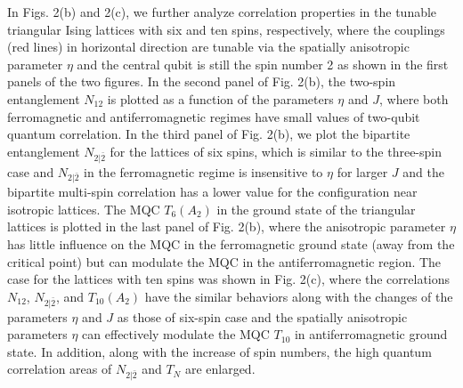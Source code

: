 \documentclass[pra,aps,twocolumn,showpacs]{revtex4}
\begin{document}
In Figs. 2(b) and 2(c), we further analyze correlation properties in the tunable triangular Ising lattices with six and ten spins, respectively, where the couplings (red lines) in horizontal direction are tunable via the spatially anisotropic parameter $\eta$ and the central qubit is still the spin number 2 as shown in the first panels of the two figures. In the second panel of Fig. 2(b), the two-spin entanglement $N_{12}$ is plotted as a function of the parameters $\eta$ and $J$, where both ferromagnetic and antiferromagnetic regimes have small values of two-qubit quantum correlation. In the third panel of Fig. 2(b), we plot the bipartite entanglement $N_{2|\bar{2}}$ for the lattices of six spins, which is similar to the three-spin case and $N_{2|\bar{2}}$ in the ferromagnetic regime is insensitive to $\eta$ for larger $J$ and the bipartite multi-spin correlation has a lower value for the configuration near isotropic lattices. The MQC $T_6(A_2)$ in the ground state of the triangular lattices is plotted in the last panel of Fig. 2(b), where the anisotropic parameter $\eta$ has little influence on the MQC in the ferromagnetic ground state (away from the critical point) but can modulate the MQC in the antiferromagnetic region. The case for the lattices with ten spins was shown in Fig. 2(c), where the correlations $N_{12}$, $N_{2|\bar{2}}$, and $T_{10}(A_2)$ have the similar behaviors along with the changes of the parameters $\eta$ and $J$ as those of six-spin case and the spatially anisotropic parameters $\eta$ can effectively modulate the MQC $T_{10}$ in antiferromagnetic ground state. In addition, along with the increase of spin numbers, the high quantum correlation areas of $N_{2|\bar{2}}$ and $T_N$ are enlarged.
\end{document}
